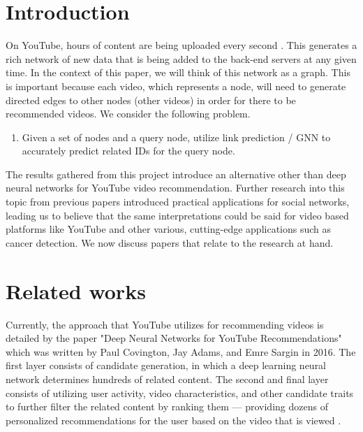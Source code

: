 \documentclass[10pt,twocolumn,letterpaper]{article}
\begin{document}
\section{Introduction}


On YouTube, hours of content are being uploaded every second \cite{youtube-original}. This generates a rich network of new data that is being added to the back-end servers at any given time. In the context of this paper, we will think of this network as a graph. This is important because each video, which represents a node, will need to generate directed edges to other nodes (other videos) in order for there to be recommended videos. We consider the following problem.

\begin{enumerate}
    \item Given a set of nodes and a query node, utilize link prediction / GNN to accurately predict related IDs for the query node.
\end{enumerate}


The results gathered from this project introduce an alternative other than deep neural networks for YouTube video recommendation. Further research into this topic from previous papers introduced practical applications for social networks, leading us to believe that the same interpretations could be said for video based platforms like YouTube and other various, cutting-edge applications such as cancer detection. We now discuss papers that relate to the research at hand.


\section{Related works}

Currently, the approach that YouTube utilizes for recommending videos is detailed by the paper "Deep Neural Networks for YouTube Recommendations" which was written by Paul Covington, Jay Adams, and Emre Sargin in 2016. The first layer consists of candidate generation, in which a deep learning neural network determines hundreds of related content. The second and final layer consists of utilizing user activity, video characteristics, and other candidate traits to further filter the related content by ranking them --- providing dozens of personalized recommendations for the user based on the video that is viewed \cite{youtube-original}.
\end{document}
